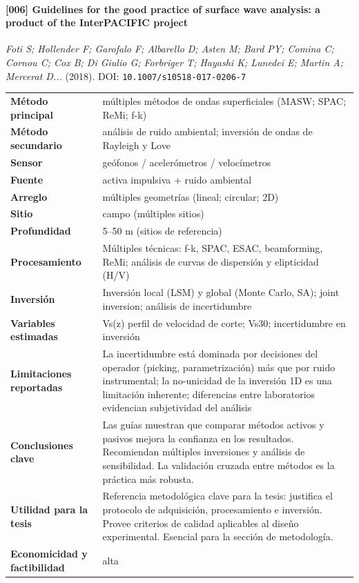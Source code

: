 \paragraph{[006] Guidelines for the good practice of surface wave analysis: a product of the InterPACIFIC project} \emph{Foti S; Hollender F; Garofalo F; Albarello D; Asten M; Bard PY; Comina C; Cornou C; Cox B; Di Giulio G; Forbriger T; Hayashi K; Lunedei E; Martin A; Mercerat D...} (2018).
{\scriptsize DOI: \texttt{10.1007/s10518-017-0206-7}}

\begin{center}\scriptsize
\begin{tabularx}{\textwidth}{@{}>{\bfseries}p{3.3cm} X@{}}
\toprule
M\'etodo principal & múltiples métodos de ondas superficiales (MASW; SPAC; ReMi; f-k) \\
M\'etodo secundario & análisis de ruido ambiental; inversión de ondas de Rayleigh y Love \\
Sensor & geófonos / acelerómetros / velocímetros \\
Fuente & activa impulsiva + ruido ambiental \\
Arreglo & múltiples geometrías (lineal; circular; 2D) \\
Sitio & campo (múltiples sitios) \\
Profundidad & 5--50 m (sitios de referencia) \\
Procesamiento & Múltiples técnicas: f-k, SPAC, ESAC, beamforming, ReMi; análisis de curvas de dispersión y elipticidad (H/V) \\
Inversi\'on & Inversión local (LSM) y global (Monte Carlo, SA); joint inversion; análisis de incertidumbre \\
Variables estimadas & Vs(z) perfil de velocidad de corte; Vs30; incertidumbre en inversión \\
Limitaciones reportadas & La incertidumbre está dominada por decisiones del operador (picking, parametrización) más que por ruido instrumental; la no-unicidad de la inversión 1D es una limitación inherente; diferencias entre laboratorios evidencian subjetividad del análisis \\
Conclusiones clave & Las guías muestran que comparar métodos activos y pasivos mejora la confianza en los resultados. Recomiendan múltiples inversiones y análisis de sensibilidad. La validación cruzada entre métodos es la práctica más robusta. \\
Utilidad para la tesis & Referencia metodológica clave para la tesis: justifica el protocolo de adquisición, procesamiento e inversión. Provee criterios de calidad aplicables al diseño experimental. Esencial para la sección de metodología. \\
Economicidad y factibilidad & alta \\
\bottomrule
\end{tabularx}
\end{center}

